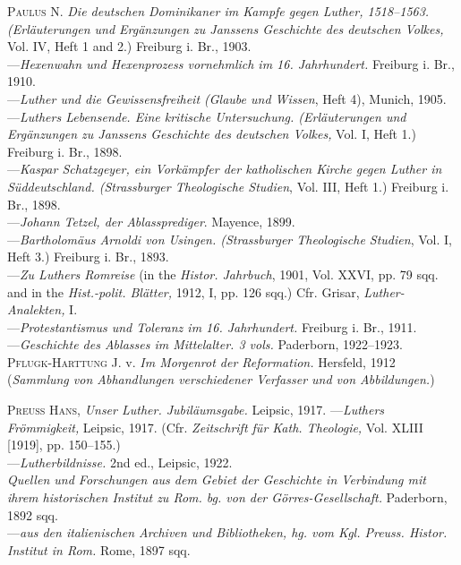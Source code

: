 \textsc{Paulus N.} \textit{Die deutschen Dominikaner im Kampfe gegen Luther, 1518--1563.
(Erläuterungen und Ergänzungen zu Janssens Geschichte des deutschen
Volkes,} Vol. IV, Heft 1 and 2.) Freiburg i. Br., 1903. \\
---\textit{Hexenwahn und Hexenprozess vornehmlich im 16. Jahrhundert.}
Freiburg i. Br., 1910. \\
---\textit{Luther und die Gewissensfreiheit (Glaube und Wissen}, Heft 4),
Munich, 1905. \\
---\textit{Luthers Lebensende. Eine kritische Untersuchung. (Erläuterungen und
Ergänzungen zu Janssens Geschichte des deutschen Volkes,} Vol. I, Heft
1.) Freiburg i. Br., 1898. \\
---\textit{Kaspar Schatzgeyer, ein Vorkämpfer der katholischen Kirche gegen
Luther in Süddeutschland. (Strassburger Theologische Studien}, Vol. III,
Heft 1.) Freiburg i. Br., 1898. \\
---\textit{Johann Tetzel, der Ablassprediger}. Mayence, 1899. \\
---\textit{Bartholomäus Arnoldi von Usingen. (Strassburger Theologische Studien},
Vol. I, Heft 3.) Freiburg i. Br., 1893. \\
---\textit{Zu Luthers Romreise} (in the \textit{Histor. Jahrbuch}, 1901, Vol. XXVI, pp.
79 sqq. and in the \textit{Hist.-polit. Blätter,} 1912, I, pp. 126 sqq.) Cfr. Grisar,
\textit{Luther-Analekten,} I. \\
---\textit{Protestantismus und Toleranz im 16. Jahrhundert.} Freiburg i. Br., 1911. \\
---\textit{Geschichte des Ablasses im Mittelalter. 3 vols.} Paderborn, 1922--1923. \\

\textsc{Pflugk-Harttung J.} v. \textit{Im Morgenrot der Reformation.} Hersfeld, 1912
(\textit{Sammlung von Abhandlungen verschiedener Verfasser und von Abbildungen.})

\textsc{Preuss Hans,} \textit{Unser Luther. Jubiläumsgabe.} Leipsic, 1917.
---\textit{Luthers Frömmigkeit,} Leipsic, 1917. (Cfr. \textit{Zeitschrift für Kath. Theologie,}
Vol. XLIII [1919], pp. 150--155.) \\
---\textit{Lutherbildnisse.} 2nd ed., Leipsic, 1922. \\

\textit{Quellen und Forschungen aus dem Gebiet der Geschichte in Verbindung
mit ihrem historischen Institut zu Rom. bg. von der Görres-Gesellschaft.}
Paderborn, 1892 sqq. \\
---\textit{aus den italienischen Archiven und Bibliotheken, hg. vom Kgl. Preuss.
Histor. Institut in Rom.} Rome, 1897 sqq. \\

